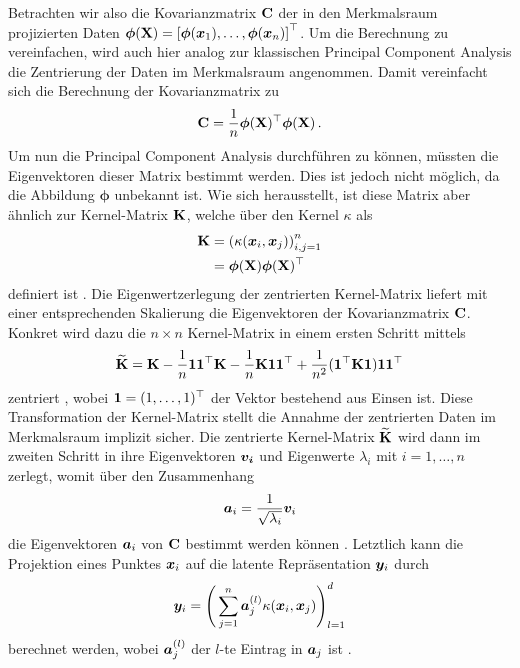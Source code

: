 Betrachten wir also die Kovarianzmatrix $\mathbf{C}$ der in den Merkmalsraum projizierten Daten
$\bm{\phi}(\mathbf{X}) = \left[ \bm{\phi}(\bm{x}_1), \ldots, \bm{\phi}(\bm{x}_n) \right]^\top$. Um
die Berechnung zu vereinfachen, wird auch hier analog zur klassischen Principal Component Analysis
die Zentrierung der Daten im Merkmalsraum angenommen. Damit vereinfacht sich die Berechnung der
Kovarianzmatrix zu
\begin{equation}
	\mathbf{C} = \frac{1}{n} \bm{\phi}(\mathbf{X})^\top \bm{\phi}(\mathbf{X}) \, .
\end{equation}
Um nun die Principal Component Analysis durchführen zu können, müssten die Eigenvektoren dieser Matrix bestimmt werden. Dies ist jedoch nicht möglich, da die Abbildung $\bm{\phi}$ unbekannt ist. Wie sich herausstellt, ist diese Matrix aber ähnlich zur Kernel-Matrix $\mathbf{K}$, welche über den Kernel $\kappa$ als
\begin{align}
	\mathbf{K} & = \left( \kappa(\bm{x}_i, \bm{x}_j) \right)_{i,j = 1}^n \label{eq:kPCA:KernelMatrix_A} \\
	        & = \bm{\phi}(\mathbf{X}) \bm{\phi}(\mathbf{X})^\top \label{eq:kPCA:KernelMatrix_B}
\end{align}
definiert ist \parencite[68]{ShaweTaylor.2011}. Die Eigenwertzerlegung der zentrierten Kernel-Matrix liefert mit
einer entsprechenden Skalierung die Eigenvektoren der Kovarianzmatrix $\mathbf{C}$. Konkret wird dazu
die $n \times n$ Kernel-Matrix in einem ersten Schritt mittels
\begin{equation}
	\label{eq:KernelCentering}
	\widetilde{\mathbf{K}} = \mathbf{K} - \frac{1}{n} \bm{1} \bm{1}^\top \mathbf{K} - \frac{1}{n} \mathbf{K} \bm{1} \bm{1}^\top + \frac{1}{n^2} (\bm{1}^\top \mathbf{K} \bm{1}) \bm{1} \bm{1}^\top
\end{equation}
zentriert \parencite[131]{ShaweTaylor.2011}, wobei $\bm{1} = (1, \ldots, 1)^\top$ der Vektor bestehend aus Einsen
ist. Diese Transformation der Kernel-Matrix stellt die Annahme der zentrierten Daten im
Merkmalsraum implizit sicher. Die zentrierte Kernel-Matrix $\widetilde{\mathbf{K}}$ wird dann im
zweiten Schritt in ihre Eigenvektoren $\bm{v_i}$ und Eigenwerte $\lambda_i$ mit $i = 1, \ldots,
	n$ zerlegt, womit über den Zusammenhang
\begin{equation}
	\label{eq:kPCA:ZusammenhangEigenvektoren}
	\bm{a}_i = \frac{1}{\sqrt{\lambda_i}} \bm{v}_i
\end{equation}
die Eigenvektoren $\bm{a}_i$ von $\mathbf{C}$ bestimmt werden können \parencite[142]{ShaweTaylor.2011}. Letztlich kann die Projektion eines Punktes $\bm{x}_i$ auf die
latente Repräsentation $\bm{y}_i$ durch
\begin{equation}
	\bm{y}_i = \Bigg( \sum_{j=1}^n \bm{a}_j^{(l)} \kappa(\bm{x}_i, \bm{x}_j) \Bigg)_{l=1}^d
\end{equation}
berechnet werden, wobei $\bm{a}_j^{(l)}$ der $l$-te Eintrag in $\bm{a}_j$ ist \parencite[150]{ShaweTaylor.2011}.

